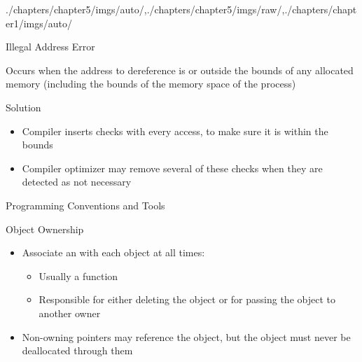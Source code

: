 \begin{graphicspathcontext}{{./chapters/chapter5/imgs/auto/},{./chapters/chapter5/imgs/raw/},{./chapters/chapter1/imgs/auto/}}
\begin{bibunit}[apalike]
\begin{frame}{{Illegal Address} Error}
	\begin{definition}
		Occurs when the address to dereference is  or outside the bounds of any allocated memory (including the bounds of the memory space of the process)
	\end{definition}
	\vspace{.25cm}
	\vspace{.25cm}
	\begin{alertblock}{Solution}
		\begin{itemize}
			\item Compiler inserts checks with every access, to make sure it is within the bounds
			\item Compiler optimizer may remove several of these checks when they are detected as not necessary
		\end{itemize}
	\end{alertblock}
\end{frame}

\begin{frame}[t]{{Programming Conventions} and Tools}
	\begin{block}{Object Ownership}
		\begin{itemize}
			\item Associate an  with each object at all times:
				\begin{itemize}
				\item Usually a function
				\item Responsible for either deleting the object or for passing the object to another owner
				\end{itemize}
			\item Non-owning pointers may reference the object, but the object must never be deallocated through them
		\end{itemize}
	\end{block}
	\vspace{.25cm}
\end{frame}


\end{bibunit}
\end{graphicspathcontext}
